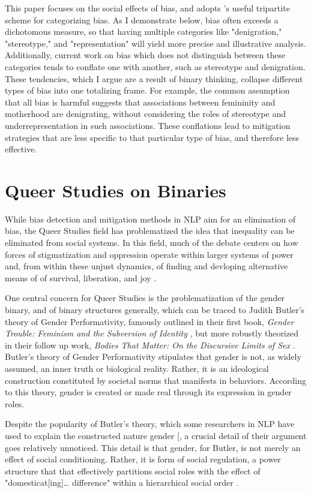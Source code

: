 \documentclass[11pt]{article}
\begin{document}
This paper focuses on the social effects of bias, and
adopts \citet{nemani:2023}'s useful tripartite scheme for categorizing
bias. As I demonstrate below, bias often exceeds a dichotomous
measure, so that having multiple categories like "denigration,"
"stereotype," and "representation" will yield more precise and
illustrative analysis. Additionally, current work on bias which does
not distinguish between these categories tends to conflate one with
another, such as stereotype and denigration. These tendencies, which I
argue are a result of binary thinking, collapse different types of
bias into one totalizing frame. For example, the common assumption
that all bias is harmful suggests that associations between femininity
and motherhood are denigrating, without considering the roles of
stereotype and underrepresentation in such associations. These
conflations lead to mitigation strategies that are less specific to
that particular type of bias, and therefore less effective.

\section{Queer Studies on Binaries}

While bias detection and mitigation methods in NLP aim for an
elimination of bias, the Queer Studies field has problematized the
idea that inequality can be eliminated from social systems. In this
field, much of the debate centers on how forces of stigmatization and
oppression operate within larger systems of power and, from within
these unjust dynamics, of finding and devloping alternative means of
of survival, liberation, and
joy \citep{love:2009,butler:1993,munoz:2009}.

One central concern for Queer Studies is the problematization of the
gender binary, and of binary structures generally, which can be traced
to Judith Butler's theory of Gender Performativity, famously outlined
in their first book, \emph{Gender Trouble: Feminism and the Subversion
of Identity} \citep{butler:1990}, but more robustly theorized in their
follow up work,
\emph{Bodies That Matter: On the Discursive Limits of Sex} \citep{butler:1993}. Butler's
theory of Gender Performativity stipulates that gender is not, as
widely assumed, an inner truth or biological reality. Rather, it is an
ideological construction constituted by societal norms that manifests
in behaviors. According to this theory, gender is created or made real
through its expression in gender roles.

Despite the popularity of Butler's theory, which some researchers in
NLP have used to explain the constructed nature gender
[\citep{devinney:2022}, a crucial detail of their argument goes
relatively unnoticed. This detail is that gender, for Butler, is not
merely an effect of social conditioning. Rather, it is form of social
regulation, a power structure that that effectively partitions social
roles with the effect of "domesticat[ing]… difference" within a
hierarchical social order \citep{butler:1993}.
\end{document}
